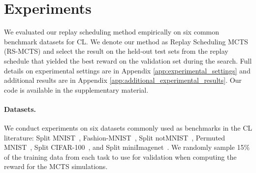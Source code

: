 



\section{Experiments}\label{sec:experiments}

We evaluated our replay scheduling method empirically on six common benchmark datasets for CL. 
We denote our method as Replay Scheduling MCTS (RS-MCTS) and select the result on the held-out test sets from the replay schedule that yielded the best reward on the validation set during the search.
Full details on experimental settings are in Appendix \ref{app:experimental_settings} and additional results are in Appendix \ref{app:additional_experimental_results}. %
Our code is available in the supplementary material. %

\vspace{-3mm}
\paragraph{Datasets.} We conduct experiments on six datasets commonly used as benchmarks in the CL literature: Split MNIST~\citep{lecun1998gradient, zenke2017continual}, Fashion-MNIST~\citep{xiao2017fashion}, Split notMNIST~\citep{bulatov2011notMNIST}, Permuted MNIST~\citep{goodfellow2013empirical}, Split CIFAR-100~\citep{krizhevsky2009learning}, and Split miniImagenet~\citep{vinyals2016matching}. We randomly sample 15\% of the training data from each task to use for validation when computing the reward for the MCTS simulations. 

\vspace{-3mm}

